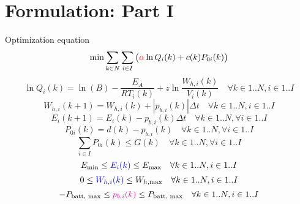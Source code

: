 \documentclass{article}
\begin{document}
	
\section{Formulation: Part I}
Optimization equation
\begin{equation}\label{eq1}
	\text{min}\sum_{k\in N}\sum_{i\in I}\begin{pmatrix}\color{red}\alpha\color{black} \ln{Q_i(k)} + c(k)P_{0i}(k) \end{pmatrix}
\end{equation}
\begin{equation}\label{eq2}
	\ln{Q_i(k)} = \ln(B) - \frac{E_A}{RT_i(k)} + z\ln{\frac{W_{h,i}(k)}{V_i(k)}} \quad \forall k\in 1..N, i\in 1..I
\end{equation}
\begin{equation}\label{eq3}
	W_{h,i}(k+1) = W_{h,i}(k) + |p_{b,i}(k)|\Delta t \quad \forall k\in 1..N, i\in 1..I
\end{equation}
\begin{equation}\label{eq4}
	E_i(k+1) = E_i(k) - p_{b,i}(k)\Delta t \quad \forall k\in 1..N, \forall i\in 1..I
\end{equation}
\begin{equation}\label{eq5}
	P_{0i}(k) = d(k) - p_{b,i}(k) \quad \forall k\in 1..N, \forall i\in 1..I
\end{equation}
\begin{equation}\label{eq6}
	\sum_{i\in I}P_{0i}(k) \leq G(k) \quad \forall k\in 1..N, \forall i\in 1..I
\end{equation}
\begin{equation}\label{eq7}
	E_{\text{min}} \leq \color{blue}E_i(k)\color{black} \leq E_{\text{max}} \quad \forall k\in 1..N, i\in 1..I
\end{equation}
\begin{equation}
	0 \leq \color{blue}W_{h,i}(k)\color{black} \leq W_{h,\text{max}} \quad \forall k\in 1..N, i\in 1..I
\end{equation}
\begin{equation}
	-P_{\text{batt, max}} \leq \color{magenta}p_{b,i}(k)\color{black} \leq P_{\text{batt, max}} \quad \forall k\in 1..N, i\in 1..I
\end{equation}
\end{document}
